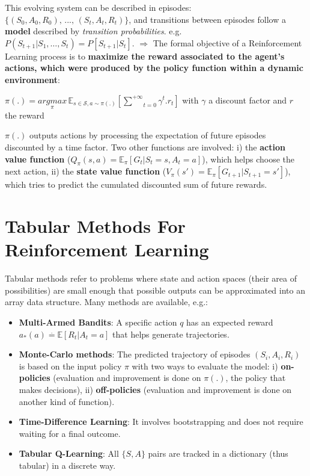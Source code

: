 \documentclass[a4paper, 10pt]{article}
\begin{document}
This evolving system can be described in episodes: $\{(S_0, A_0, R_0),\, ...,\, (S_t, A_t, R_t)\}$, and transitions between episodes follow a \textbf{model} described by \textit{transition probabilities}. e.g. $P(S_{t+1}|S_1,…,S_t) = P[S_{t+1}|S_t]$.
\newline\newline
$\Rightarrow$ The formal objective of a Reinforcement Learning process is to \textbf{maximize the reward associated to the agent's actions, which were produced by the policy function within a dynamic environment}:
\newline\newline
\centerline{$\pi(.) = \underset{\pi}{argmax}\,\mathbb{E}_{s\in\mathcal{S}, a\sim\pi(.)}[\underset{t=0}{\overset{+\infty}{\sum}}\gamma^t.r_t]$ with $\gamma$ a discount factor and $r$ the reward}
\newline\newline
$\pi(.)$ outputs actions by processing the expectation of future episodes discounted by a time factor.
\newline\newline
Two other functions are involved: i) the \textbf{action value function} ($Q_{\pi}(s, a) = \mathbb{E}_\pi[G_t|S_t=s, A_t=a]$), which helps choose the next action, ii) the \textbf{state value function} ($V_\pi(s')=\mathbb{E}_\pi[G_{t+1}|S_{t+1}=s']$), which tries to predict the cumulated discounted sum of future rewards.


\section{Tabular Methods For Reinforcement Learning}

Tabular methods refer to problems where state and action spaces (their area of possibilities) are small enough that possible outputs can be approximated into an array data structure. Many methods are available, e.g.:
\begin{itemize}
  \item \textbf{Multi-Armed Bandits}: A specific action $q$ has an expected reward $a_\ast(a)\overset{.}{=}\mathbb{E}[R_t|A_t=a]$ that helps generate trajectories.
  \item \textbf{Monte-Carlo methods}: The predicted trajectory of episodes $(S_i, A_i, R_i)$ is based on the input policy $\pi$ with two ways to evaluate the model: i) \textbf{on-policies} (evaluation and improvement is done on $\pi(.)$, the policy that makes decisions), ii) \textbf{off-policies} (evaluation and improvement is done on another kind of function).
  \item \textbf{Time-Difference Learning}: It involves bootstrapping and does not require waiting for a final outcome.
  \item \textbf{Tabular Q-Learning}: All $\{S, A\}$ pairs are tracked in a dictionary (thus tabular) in a discrete way.
\end{itemize}
\end{document}
